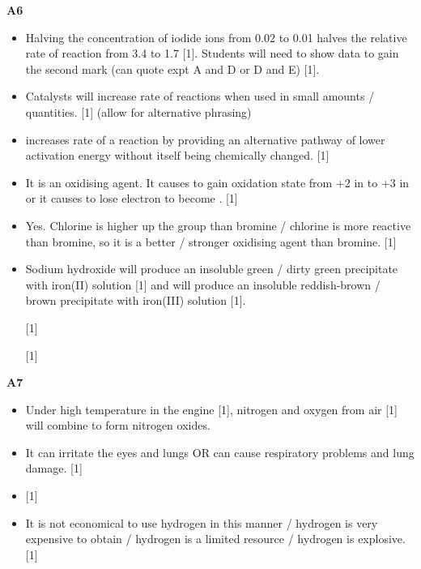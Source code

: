 \documentclass[11pt]{exam}
\begin{document}
\textbf{A6}
\begin{itemize}
\item[(a)] Halving the concentration of iodide ions from 0.02 to 0.01 halves the relative rate of reaction from 3.4 to 1.7 [1]. Students will need to show data to gain the second mark (can quote expt A and D or D and E) [1].

\item[(b)(i)] Catalysts will increase rate of reactions when used in small amounts / quantities. [1] (allow for alternative phrasing)

\item[(b)(ii)]  increases rate of a reaction by providing an alternative pathway of lower activation energy without itself being chemically changed. [1]

\item[(c)(i)] It is an oxidising agent. It causes  to gain oxidation state from +2 in  to +3 in  or it causes  to lose electron to become . [1]

\item[(c)(ii)] Yes. Chlorine is higher up the group than bromine / chlorine is more reactive than bromine, so it is a better / stronger oxidising agent than bromine. [1]

\item[(d)] Sodium hydroxide will produce an insoluble green / dirty green precipitate with iron(II) solution [1] and will produce an insoluble reddish-brown / brown precipitate with iron(III) solution [1].

 [1]

 [1]
\end{itemize}

\textbf{A7}
\begin{itemize}
\item[(a)] Under high temperature in the engine [1], nitrogen and oxygen from air [1] will combine to form nitrogen oxides.

\item[(b)(i)] It can irritate the eyes and lungs OR can cause respiratory problems and lung damage. [1]

\item[(b)(ii)]  [1]

\item[(b)(iii)] It is not economical to use hydrogen in this manner / hydrogen is very expensive to obtain / hydrogen is a limited resource / hydrogen is explosive. [1]
\end{itemize}
\end{document}
